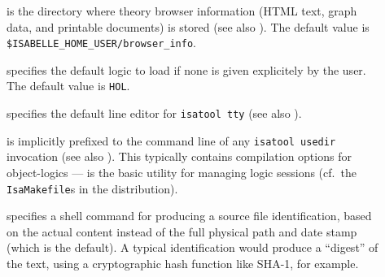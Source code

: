 \begin{isabellebody}
\begin{isamarkuptext}
\begin{description}
  \item[\hypertarget{setting.ISABELLE-BROWSER-INFO}{\hyperlink{setting.ISABELLE-BROWSER-INFO}{\mbox{}}}] is the directory where
  theory browser information (HTML text, graph data, and printable
  documents) is stored (see also ).  The default
  value is \verb|$ISABELLE_HOME_USER/browser_info|.
  
  \item[\hypertarget{setting.ISABELLE-LOGIC}{\hyperlink{setting.ISABELLE-LOGIC}{\mbox{}}}] specifies the default logic to
  load if none is given explicitely by the user.  The default value is
  \verb|HOL|.
  
  \item[\hypertarget{setting.ISABELLE-LINE-EDITOR}{\hyperlink{setting.ISABELLE-LINE-EDITOR}{\mbox{}}}] specifies the default
  line editor for \verb|isatool tty| (see also
  ).

  \item[\hypertarget{setting.ISABELLE-USEDIR-OPTIONS}{\hyperlink{setting.ISABELLE-USEDIR-OPTIONS}{\mbox{}}}] is implicitly prefixed
  to the command line of any \verb|isatool usedir| invocation
  (see also ). This typically contains
  compilation options for object-logics --- \hyperlink{tool.usedir}{\mbox{}} is the
  basic utility for managing logic sessions (cf.\ the \verb|IsaMakefile|s in the distribution).

  \item[\hypertarget{setting.ISABELLE-FILE-IDENT}{\hyperlink{setting.ISABELLE-FILE-IDENT}{\mbox{}}}] specifies a shell command
  for producing a source file identification, based on the actual
  content instead of the full physical path and date stamp (which is
  the default). A typical identification would produce a ``digest'' of
  the text, using a cryptographic hash function like SHA-1, for
  example.
  

\end{description}
\end{isamarkuptext}
\end{isabellebody}
